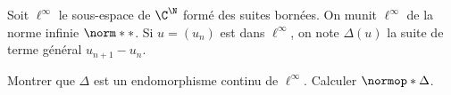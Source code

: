 \begin{enonce}
\begin{exercise}[ID={RMS 122-2 E1231 (TPE)},subtitle={},tags={}]
  Soit $\ell^\infty$ le sous-espace de $\C^{\N}$ formé des suites bornées.
  On munit $\ell^\infty$ de la norme infinie $\norm**$.
  Si $u=\left( u_n \right)$ est dans $\ell^\infty$, on note $\Delta(u)$ la suite de terme général $u_{n+1}-u_n$.

  Montrer que $\Delta$ est un endomorphisme continu de $\ell^\infty$.
  Calculer $\normop*\Delta$.
\end{exercise}
\begin{solution}
\end{solution}
\end{enonce}
